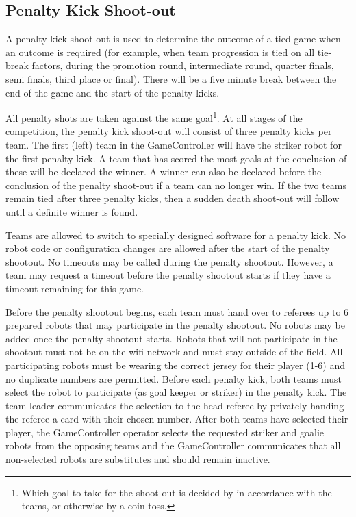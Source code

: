 \documentclass[12pt]{article}
\begin{document}
\subsection{Penalty Kick Shoot-out}
\label{sec:penalty_shoot-out}

A penalty kick shoot-out is used to determine the outcome of a tied game when an outcome is required (for example, when team progression is tied on all tie-break factors, during the promotion round, intermediate round, quarter finals, semi finals, third place or final).
There will be a five minute break between the end of the game and the start of the penalty kicks.

All penalty shots are taken against the same goal\footnote{Which goal to take for the shoot-out is decided by in accordance with the teams, or otherwise by a coin toss.}.
At all stages of the competition, the penalty kick shoot-out will consist of three penalty kicks per team.
The first (left) team in the GameController will have the striker robot for the first penalty kick.
A team that has scored the most goals at the conclusion of these will be declared the winner. A winner can also be declared before the conclusion of the penalty shoot-out if a team can no longer win. If the two teams remain tied after three penalty kicks, then a sudden death shoot-out will follow until a definite winner is found.

Teams are allowed to switch to specially designed software for a penalty kick. No robot code or configuration changes are allowed after the start of the penalty shootout. No timeouts may be called during the penalty shootout. However, a team may request a timeout before the penalty shootout starts if they have a timeout remaining for this game.

Before the penalty shootout begins, each team must hand over to referees up to 6 prepared robots that may participate in the penalty shootout. No robots may be added once the penalty shootout starts. Robots that will not participate in the shootout must not be on the wifi network and must stay outside of the field. All participating robots must be wearing the correct jersey for their player (1-6) and no duplicate numbers are permitted. Before each penalty kick, both teams must select the robot to participate (as goal keeper or striker) in the penalty kick. The team leader communicates the selection to the head referee by privately handing the referee a card with their chosen number. After both teams have selected their player, the GameController operator selects the requested striker and goalie robots from the opposing teams and the GameController communicates that all non-selected robots are substitutes and should remain inactive.
\end{document}
